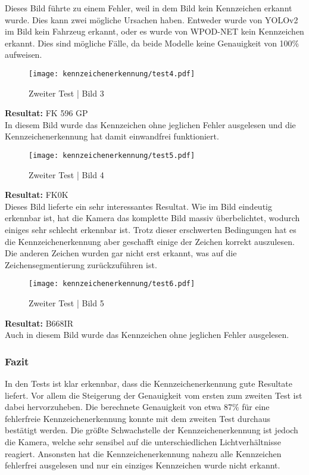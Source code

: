 Dieses Bild führte zu einem Fehler, weil in dem Bild kein Kennzeichen erkannt wurde. Dies kann zwei mögliche Ursachen haben. 
Entweder wurde von YOLOv2 im Bild kein Fahrzeug erkannt, oder es wurde von WPOD-NET kein Kennzeichen erkannt. Dies sind mögliche Fälle, da beide Modelle keine 
Genauigkeit von 100\% aufweisen.

\begin{figure}[H]
    \centering
    \texttt{[image: kennzeichenerkennung/test4.pdf]}
    \caption{Zweiter Test | Bild 3}
\end{figure}

\textbf{Resultat:} FK 596 GP\\

In diesem Bild wurde das Kennzeichen ohne jeglichen Fehler ausgelesen und die Kennzeichenerkennung hat damit einwandfrei funktioniert.

\begin{figure}[H]
    \centering
    \texttt{[image: kennzeichenerkennung/test5.pdf]}
    \caption{Zweiter Test | Bild 4}
\end{figure}

\textbf{Resultat:} FK0K\\

Dieses Bild lieferte ein sehr interessantes Resultat. Wie im Bild eindeutig erkennbar ist, hat die Kamera das komplette Bild massiv überbelichtet, 
wodurch einiges sehr schlecht erkennbar ist. Trotz dieser erschwerten Bedingungen hat es die Kennzeichenerkennung aber geschafft einige der Zeichen 
korrekt auszulesen. Die anderen Zeichen wurden gar nicht erst erkannt, was auf die Zeichensegmentierung zurückzuführen ist.

\begin{figure}[H]
    \centering
    \texttt{[image: kennzeichenerkennung/test6.pdf]}
    \caption{Zweiter Test | Bild 5}
\end{figure}

\textbf{Resultat:} B668IR\\

Auch in diesem Bild wurde das Kennzeichen ohne jeglichen Fehler ausgelesen.

\subsubsection{Fazit}
In den Tests ist klar erkennbar, dass die Kennzeichenerkennung gute Resultate liefert. Vor allem die Steigerung der Genauigkeit vom ersten zum zweiten 
Test ist dabei hervorzuheben. Die berechnete Genauigkeit von etwa 87\% für eine fehlerfreie Kennzeichenerkennung konnte mit dem zweiten Test durchaus bestätigt werden. 
Die größte Schwachstelle der Kennzeichenerkennung ist jedoch die Kamera, welche sehr sensibel auf die unterschiedlichen Lichtverhältnisse reagiert. 
Ansonsten hat die Kennzeichenerkennung nahezu alle Kennzeichen fehlerfrei ausgelesen und nur ein einziges Kennzeichen wurde nicht erkannt. 